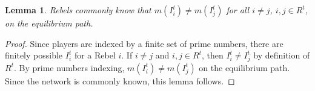 \documentclass[12pt,letter]{article}
\newtheorem{lemma}{Lemma}[section]
\theoremstyle{definition}
\theoremstyle{remark}
\theoremstyle{claim}
\begin{document}
\begin{lemma}
Rebels commonly know that $m(I^t_i)\neq m(I^t_j)$ for all $i\neq j$, $i,j\in R^t$, on the equilibrium path. 
\end{lemma}
\begin{proof}
Since players are indexed by a finite set of prime numbers, there are finitely possible $I^t_i$ for a Rebel $i$. If $i\neq j$ and $i,j\in R^t$, then $I^t_i\neq I^t_j$ by definition of $R^t$. By prime numbers indexing, $m(I^t_i)\neq m(I^t_j)$ on the equilibrium path. Since the network is commonly known, this lemma follows. 
\end{proof}


%
%
%
\end{document}
